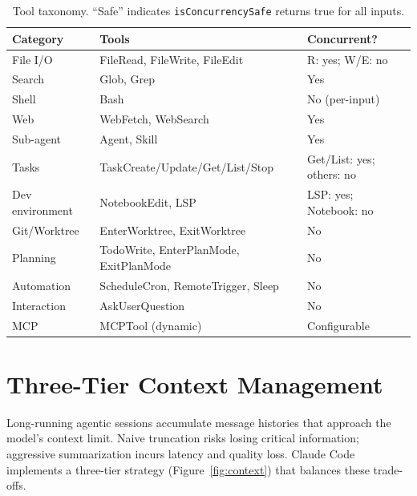 \documentclass{article}
\newcommand{\code}[1]{\texttt{#1}}
\begin{document}
\begin{table}[t]
\centering
\caption{Tool taxonomy. ``Safe'' indicates \code{isConcurrencySafe} returns true for all inputs.}
\label{tab:tools}
\small
\begin{tabular}{lll}
\toprule
\textbf{Category} & \textbf{Tools} & \textbf{Concurrent?} \\
\midrule
File I/O        & FileRead, FileWrite, FileEdit                  & R: yes; W/E: no \\
Search          & Glob, Grep                                     & Yes \\
Shell           & Bash                                           & No (per-input) \\
Web             & WebFetch, WebSearch                            & Yes \\
Sub-agent       & Agent, Skill                                   & Yes \\
Tasks           & TaskCreate/Update/Get/List/Stop                & Get/List: yes; others: no \\
Dev environment & NotebookEdit, LSP                              & LSP: yes; Notebook: no \\
Git/Worktree    & EnterWorktree, ExitWorktree                    & No \\
Planning        & TodoWrite, EnterPlanMode, ExitPlanMode         & No \\
Automation      & ScheduleCron, RemoteTrigger, Sleep             & No \\
Interaction     & AskUserQuestion                                & No \\
MCP             & MCPTool (dynamic)                              & Configurable \\
\bottomrule
\end{tabular}
\end{table}

\section{Three-Tier Context Management}
\label{sec:context}

Long-running agentic sessions accumulate message histories that approach the model's context limit. Naive truncation risks losing critical information; aggressive summarization incurs latency and quality loss. Claude Code implements a three-tier strategy (Figure~\ref{fig:context}) that balances these trade-offs.
\end{document}
